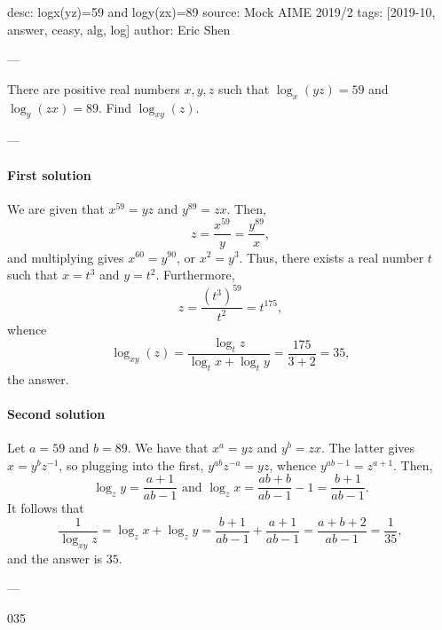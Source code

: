 desc: logx(yz)=59 and logy(zx)=89
source: Mock AIME 2019/2
tags: [2019-10, answer, ceasy, alg, log]
author: Eric Shen

---

There are positive real numbers $x,y,z$ such that $\log_x(yz)=59$ and $\log_y(zx)=89$. Find $\log_{xy}(z)$.

---

\paragraph{First solution}     We are given that $x^{59}=yz$ and $y^{89}=zx$. Then, \[z=\frac{x^{59}}y=\frac{y^{89}}x,\]
and multiplying gives  $x^{60}=y^{90}$, or $x^2=y^3$. Thus, there exists a real number $t$ such that $x=t^3$ and $y=t^2$. Furthermore, \[z=\frac{(t^3)^{59}}{t^2}=t^{175},\]
whence \[\log_{xy}(z)=\frac{\log_t z}{\log_t x+\log_t y}=\frac{175}{3+2}=35,\]
the answer.

\paragraph{Second solution}     Let $a=59$ and $b=89$. We have that $x^a=yz$ and $y^b=zx$. The latter gives $x=y^bz^{-1}$, so plugging into the first, $y^{ab}z^{-a}=yz$, whence $y^{ab-1}=z^{a+1}$. Then, \[\log_z y=\frac{a+1}{ab-1}\text{ and }\log_z x=\frac{ab+b}{ab-1}-1=\frac{b+1}{ab-1}.\] It follows that \[\frac1{\log_{xy} z}=\log_z x+\log_z y=\frac{b+1}{ab-1}+\frac{a+1}{ab-1}=\frac{a+b+2}{ab-1}=\frac1{35},\]and the answer is $35$.


---

035

